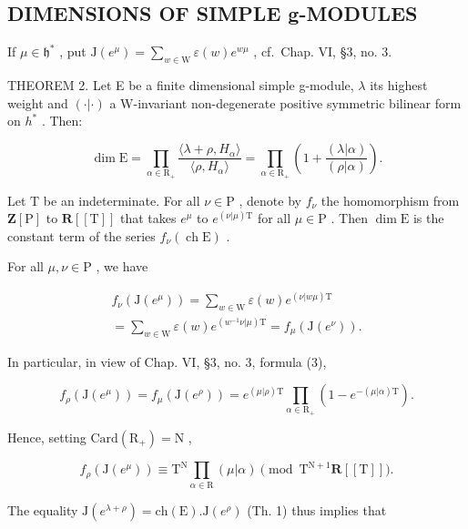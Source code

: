 \subsection{DIMENSIONS OF SIMPLE g-MODULES}

If \(\mu \in \mathfrak{h}^*\) , put \(\mathrm{J}(e^{\mu}) = \sum_{w\in \mathrm{W}}\varepsilon (w)e^{w\mu}\) , cf.~Chap. VI, §3, no. 3.

THEOREM 2. Let E be a finite dimensional simple g-module, \(\lambda\) its highest weight and \((\cdot|\cdot)\) a W-invariant non-degenerate positive symmetric bilinear form on \(h^{*}\) . Then:

\[
\dim \mathrm{E} = \prod_ {\alpha \in \mathrm{R} _ {+}} \frac {\langle \lambda + \rho , H _ {\alpha} \rangle}{\langle \rho , H _ {\alpha} \rangle} = \prod_ {\alpha \in \mathrm{R} _ {+}} \left(1 + \frac {(\lambda | \alpha)}{(\rho | \alpha)}\right).
\]

Let \(\mathrm{T}\) be an indeterminate. For all \(\nu \in \mathrm{P}\) , denote by \(f_{\nu}\) the homomorphism from \(\mathbf{Z}[\mathrm{P}]\) to \(\mathbf{R}[[\mathrm{T}]]\) that takes \(e^{\mu}\) to \(e^{(\nu |\mu)\mathrm{T}}\) for all \(\mu \in \mathrm{P}\) . Then \(\dim \mathrm{E}\) is the constant term of the series \(f_{\nu}(\operatorname{ch}\mathrm{E})\) .

For all \(\mu, \nu \in \mathrm{P}\) , we have

\[
\begin{array}{c} f _ {\nu} (\mathrm{J} (e ^ {\mu})) = \sum_ {w \in \mathrm{W}} \varepsilon (w) e ^ {(\nu | w \mu) \mathrm{T}} \\ = \sum_ {w \in \mathrm{W}} \varepsilon (w) e ^ {(w ^ {- 1} \nu | \mu) \mathrm{T}} = f _ {\mu} (\mathrm{J} (e ^ {\nu})). \end{array}
\]

In particular, in view of Chap. VI, §3, no. 3, formula (3),

\[
f _ {\rho} (\mathrm{J} (e ^ {\mu})) = f _ {\mu} (\mathrm{J} (e ^ {\rho})) = e ^ {(\mu | \rho) \mathrm{T}} \prod_ {\alpha \in \mathrm{R} _ {+}} (1 - e ^ {- (\mu | \alpha) \mathrm{T}}).
\]

Hence, setting \(\mathrm{Card}(\mathrm{R}_{+})=\mathrm{N}\) ,

\[
f _ {\rho} (\mathrm{J} (e ^ {\mu})) \equiv \mathrm{T} ^ {\mathrm{N}} \prod_ {\alpha \in \mathrm{R}} (\mu | \alpha) \pmod {\mathrm{T} ^ {\mathrm{N} + 1} \mathbf {R} [ [ \mathrm{T} ] ]}.
\]

The equality \(\mathrm{J}(e^{\lambda +\rho}) = \mathrm{ch}(\mathrm{E}).\mathrm{J}(e^{\rho})\) (Th. 1) thus implies that

